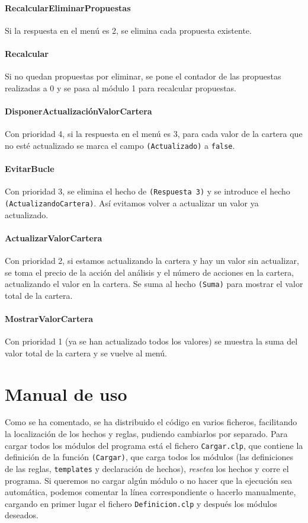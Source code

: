 \documentclass[11pt,leqno]{article}
\theoremstyle{definition_wo_parentheses}
\theoremstyle{plain}
\theoremstyle{remark}
\begin{document}
\paragraph{RecalcularEliminarPropuestas} Si la respuesta en el menú es 2, se elimina cada propuesta existente. 

\paragraph{Recalcular} Si no quedan propuestas por eliminar, se pone el contador de las propuestas realizadas a 0 y se pasa al módulo 1 para recalcular propuestas.

\paragraph{DisponerActualizaciónValorCartera} Con prioridad 4, si la respuesta en el menú es 3, para cada valor de la cartera que no esté actualizado se marca el campo \texttt{(Actualizado)} a \texttt{false}.

\paragraph{EvitarBucle} Con prioridad 3, se elimina el hecho de \texttt{(Respuesta 3)} y se introduce el hecho \texttt{(ActualizandoCartera)}. Así evitamos volver a actualizar un valor ya actualizado.

\paragraph{ActualizarValorCartera} Con prioridad 2, si estamos actualizando la cartera y hay un valor sin actualizar, se toma el precio de la acción del análisis y el número de acciones en la cartera, actualizando el valor en la cartera. Se suma al hecho \texttt{(Suma)} para mostrar el valor total de la cartera.

\paragraph{MostrarValorCartera} Con prioridad 1 (ya se han actualizado todos los valores) se muestra la suma del valor total de la cartera y se vuelve al menú.

\section{Manual de uso}

Como se ha comentado, se ha distribuido el código en varios ficheros, facilitando la localización de los hechos y reglas, pudiendo cambiarlos por separado. Para cargar todos los módulos del programa está el fichero \texttt{Cargar.clp}, que contiene la definición de la función \texttt{(Cargar)}, que carga todos los módulos (las definiciones de las reglas, \texttt{templates} y declaración de hechos), \textit{resetea} los hechos y corre el programa. Si queremos no cargar algún módulo o no hacer que la ejecución sea automática, podemos comentar la línea correspondiente o hacerlo manualmente, cargando en primer lugar el fichero \texttt{Definicion.clp} y después los módulos deseados.\\
\end{document}
